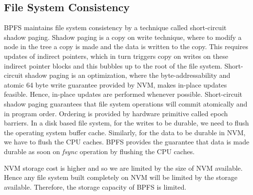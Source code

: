 \subsection{File System Consistency}
BPFS maintains file system consistency by a technique called short-circuit shadow paging. Shadow paging is a copy on write technique, where to modify a node in the tree a copy is made and the data is written to the copy. This requires updates of indirect pointers, which in turn triggers copy on writes on these indirect pointer blocks and this bubbles up to the root of the file system. Short-circuit shadow paging is an optimization, where the byte-addressability and atomic 64 byte write guarantee provided by NVM, makes in-place updates feasible. Hence, in-place updates are performed whenever possible. Short-circuit shadow paging guarantees that file system operations will commit atomically and in program order. Ordering is provided by hardware primitive called epoch barriers. In a disk based file system, for the writes to be durable, we need to flush the operating system buffer cache. Similarly, for the data to be durable in NVM, we have to flush the CPU caches. BPFS provides the guarantee that data is made durable as soon on \textit{fsync} operation by flushing the CPU caches.


NVM storage cost is higher and so we are limited by the size of NVM available. Hence any file system built completely on NVM will be limited by the storage available. Therefore, the storage capacity of BPFS is limited.